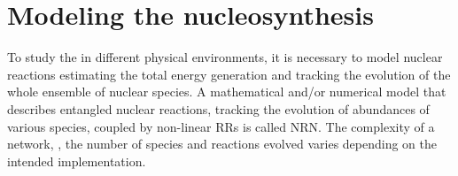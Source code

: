 
\section{Modeling the nucleosynthesis}\label{sec:nucleo:method}

%
To study the \nuc{} in different physical environments, it is necessary to 
model nuclear reactions estimating the total energy generation 
\citep[\eg][]{Weaver:1978,Mueller:1986,Timmes:1999} and tracking the 
evolution of the whole ensemble of nuclear species. A mathematical and/or 
numerical model that describes entangled nuclear reactions, tracking the 
evolution of abundances of various species, coupled by non-linear 
\acp{RR} is called \ac{NRN}.%
%
The complexity of a network, \ie, the number of species and reactions evolved 
varies depending on the intended implementation. 
%
